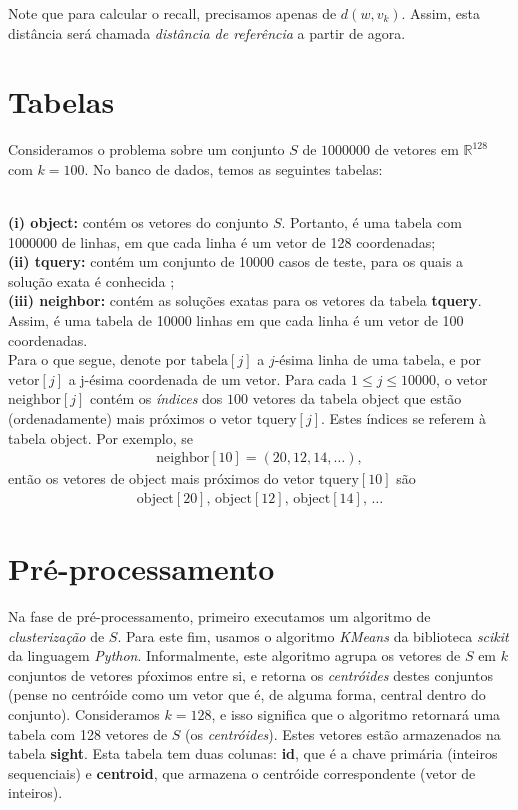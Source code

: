 \documentclass[a4paper,12pt,titlepage]{scrartcl}
\begin{document}
Note que para calcular o recall, precisamos apenas de $d(w,v_k)$. Assim, esta distância será chamada \emph{distância de referência} a partir de agora. 

\section{Tabelas}

Consideramos o problema sobre um conjunto $S$ de $1000000$ de vetores em $\mathbb{R}^{128}$ com $k = 100$. No banco de dados, temos as seguintes tabelas:\\\

\noindent\textbf{(i) object:} contém os vetores do conjunto $S$. Portanto, é uma tabela com 1000000 de linhas, em que cada linha é um vetor de 128 coordenadas;\\

\noindent\textbf{(ii) tquery:} contém um conjunto de 10000 casos de teste, para os quais a solução exata é conhecida ; \\

\noindent\textbf{(iii) neighbor:} contém as soluções exatas para os vetores da tabela \textbf{tquery}. Assim, é uma tabela de 10000 linhas em que cada linha é um vetor de 100 coordenadas.\\

Para o que segue, denote por $\mathrm{tabela}[j]$ a $j$-ésima linha de uma tabela, e por $\mathrm{vetor}[j]$ a j-ésima coordenada de um vetor. Para cada $1 \leq j \leq 10000$, o vetor $\mathrm{neighbor}[j]$ contém os \emph{índices} dos $100$ vetores da tabela object que estão (ordenadamente) mais próximos o vetor $\mathrm{tquery}[j]$. Estes índices se referem à tabela object. Por exemplo, se
\begin{align*} \mathrm{neighbor}[10] = (20,12,14,\ldots),
\end{align*}
então os vetores de object mais próximos do vetor $\mathrm{tquery}[10]$ são 
\begin{align*}\mathrm{object}[20], \,\mathrm{object}[12],\, \mathrm{object}[14],\, \ldots 
\end{align*}

\section{Pré-processamento}

Na fase de pré-processamento, primeiro executamos um algoritmo de \emph{clusterização} de $S$. Para este fim, usamos o algoritmo \emph{KMeans} da biblioteca \emph{scikit} da linguagem \emph{Python}. Informalmente, este algoritmo agrupa os vetores de $S$ em $k$ conjuntos de vetores pŕoximos entre si, e retorna os \emph{centróides} destes conjuntos (pense no centróide como um vetor que é, de alguma forma, central dentro do conjunto). Consideramos $k = 128$, e isso significa que o algoritmo retornará uma tabela com 128 vetores de $S$ (os \emph{centróides}). Estes vetores estão armazenados na tabela \textbf{sight}. Esta tabela tem duas colunas: \textbf{id}, que é a chave primária (inteiros sequenciais) e \textbf{centroid}, que armazena o centróide correspondente (vetor de inteiros). 
\end{document}
